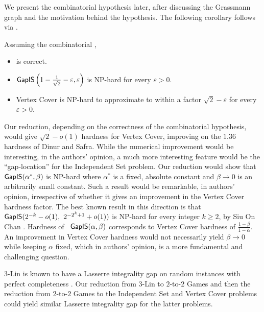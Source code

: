 \documentclass{toc}
\newcommand\eps{\varepsilon}
\begin{document}
We present the combinatorial hypothesis later, after discussing the Grassmann graph and the motivation behind the hypothesis.
The following corollary follows via .
\begin{corollary}\label{thm:main2} Assuming the combinatorial ,
\begin{itemize}
\item {} is correct.
\item ${\sf GapIS}\left(1-\frac{1}{\sqrt{2}}-\eps, \eps\right)$ is NP-hard for every $\eps>0$.  %
%
\item Vertex Cover is NP-hard to approximate to within a factor $\sqrt{2}-\eps$ for every $\eps>0$.%
\end{itemize}
\end{corollary}



\begin{remark} Our reduction, depending on the correctness of the combinatorial hypothesis, would give $\sqrt{2} - o(1)$ hardness
for Vertex Cover, improving on the $1.36$ hardness of Dinur and Safra. While the numerical improvement would be interesting, in the
authors' opinion, a much more interesting feature would be the ``gap-location'' for the Independent Set problem. Our
reduction would show that ${\sf GapIS}(\alpha^*, \beta)$ is NP-hard where $\alpha^*$ is a fixed, absolute constant and $\beta \to 0$ is
an arbitrarily small constant. Such a result would be remarkable, in authors' opinion, irrespective of whether it gives an
improvement in the Vertex Cover hardness factor. The best known result in this direction is that ${\sf GapIS}(2^{-k}- o(1),
 ~2^{-2^k+1}+o(1))$ is NP-hard for every integer $k \geqslant 2$, by
Siu On Chan \cite{Chan13}. Hardness of ~${\sf GapIS}(\alpha, \beta)$ corresponds to Vertex Cover hardness of $\frac{1-\beta}{1-\alpha}$.
An improvement in Vertex Cover hardness would not necessarily yield $\beta \to 0$ while keeping $\alpha$ fixed, which in authors'
opinion, is a more fundamental and challenging question.
\end{remark}



\begin{remark}
$3$-Lin is known to have a %
Lasserre %
integrality gap %
on random instances  with perfect completeness \cite{Grigoriev, Schoen08, Tul09}.
Our reduction from $3$-Lin to $2$-to-$2$ Games and then the reduction from $2$-to-$2$ Games to the Independent Set and
Vertex Cover problems could yield similar Lasserre integrality gap for the latter problems.
%
%
%
\end{remark}
\end{document}
